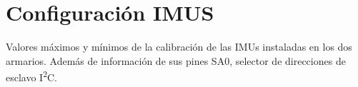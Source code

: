
\chapter{Configuración IMUS} %

\label{app:imuvalues} %

Valores máximos y mínimos de la calibración de las IMUs instaladas en los dos armarios. Además de información de sus pines SA0, selector de direcciones de esclavo I\textsuperscript{2}C.

\newpage


